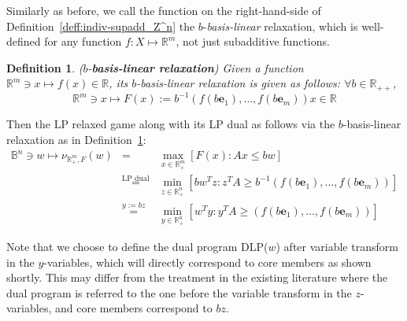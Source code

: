 \documentclass[11pt]{article}\usepackage[]{graphicx}\usepackage[]{xcolor}
\newtheorem{deff}{Definition}
\begin{document}
Similarly as before, we call the function on the right-hand-side of Definition~\ref{deff:indiv-supadd_Z^n} the $b$-\emph{basis-linear} relaxation, which is well-defined for any function $f: X\mapsto \mathbb{R}^m$, not just  subadditive functions.
\begin{deff}\label{deff:basis-linear-relaxation} ($b$-\textbf{basis-linear relaxation}) Given a function $\mathbb{R}^m\ni x\mapsto f(x)\in\mathbb{R}$, its $b$-basis-linear relaxation is given as follows: $\forall b\in\mathbb{R}_{++}$, 
\[
\mathbb{R}^m\ni x\mapsto F(x):=b^{-1}(f(b\mathbf{e}_1),\dots, f(b\mathbf{e}_m))x\in\mathbb{R}
\]
\end{deff}

Then the LP relaxed game along with its LP dual as follows via the $b$-basis-linear relaxation as in Definition~\ref{deff:basis-linear-relaxation}:
\begin{eqnarray}
\label{eq:NLP-relax-primal-rhs}\mathbb{B}^n\ni w\mapsto \nu_{\mathbb{R}^m_{+}, F}\left(w\right)&=&\max\limits_{x\in \mathbb{R}^m_{+}} \left[F(x): Ax\le bw\right]\\
\nonumber&\overset{\text{LP dual}}{=}&\min_{z\in\mathbb{R}^n_{+}}\left[bw^Tz: z^TA\ge b^{-1}(f(b\mathbf{e}_1),\dots, f(b\mathbf{e}_m))\right] \\
\label{eq:NLP-relax-dual-rhs}&\overset{y:=bz}{=}&\min_{y\in\mathbb{R}^n_{+}}\left[w^Ty: y^TA\ge (f(b\mathbf{e}_1),\dots, f(b\mathbf{e}_m))\right]
\end{eqnarray}

Note that we choose to define the dual program DLP($w$) after variable transform in the $y$-variables, which will directly correspond to core members as shown shortly. This may differ from the treatment in the existing literature where the dual program is referred to the one before the variable transform in the $z$-variables, and core members correspond to $bz$. 
\end{document}
